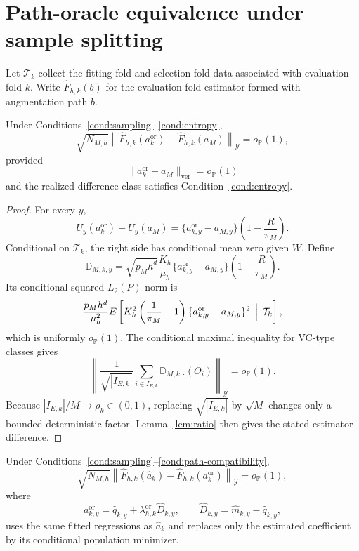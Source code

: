\section{Path-oracle equivalence under sample splitting}
\label{sec:supp-oracle}

Let \(\mathcal T_k\) collect the fitting-fold and selection-fold data associated with evaluation fold \(k\).
Write \(\widehat F_{h,k}(b)\) for the evaluation-fold estimator formed with augmentation path \(b\).

\begin{lemma}
\label{lem:nuisance-perturb}
Under Conditions~\ref{cond:sampling}--\ref{cond:entropy},
\[
\sqrt{N_{M,h}}
\left\|
\widehat F_{h,k}(a_k^{\mathrm{or}})
-
\widehat F_{h,k}(a_M)
\right\|_{\mathcal Y}
=o_{\mathbb P}(1),
\]
provided
\[
\|a_k^{\mathrm{or}}-a_M\|_{\mathrm{ver}}
=o_{\mathbb P}(1)
\]
and the realized difference class satisfies Condition~\ref{cond:entropy}.
\end{lemma}

\begin{proof}
For every \(y\),
\begin{equation}
U_y(a_k^{\mathrm{or}})-U_y(a_M)
=
\{a_{k,y}^{\mathrm{or}}-a_{M,y}\}
\left(1-\frac{R}{\pi_M}\right).
\label{eq:nuisance-exact}
\end{equation}
Conditional on \(\mathcal T_k\), the right side has conditional mean zero given \(W\). Define
\[
\mathbb D_{M,k,y}
=
\sqrt{p_Mh^d}
\frac{K_h}{\mu_h}
\{a_{k,y}^{\mathrm{or}}-a_{M,y}\}
\left(1-\frac{R}{\pi_M}\right).
\]
Its conditional squared \(L_2(P)\) norm is
\[
\frac{p_Mh^d}{\mu_h^2}
E\left[
K_h^2
\left(\frac1{\pi_M}-1\right)
\{a_{k,y}^{\mathrm{or}}-a_{M,y}\}^2
\,\Bigm|\,\mathcal T_k
\right],
\]
which is uniformly \(o_{\mathbb P}(1)\). The conditional maximal inequality for VC-type classes gives
\[
\left\|
\frac1{\sqrt{|I_{E,k}|}}
\sum_{i\in I_{E,k}}
\mathbb D_{M,k,\cdot}(O_i)
\right\|_{\mathcal Y}
=o_{\mathbb P}(1).
\]
Because \(|I_{E,k}|/M\to\rho_k\in(0,1)\), replacing \(\sqrt{|I_{E,k}|}\) by \(\sqrt M\) changes only a bounded deterministic factor. Lemma~\ref{lem:ratio} then gives the stated estimator difference.
\end{proof}

\begin{lemma}
\label{lem:coefficient-perturb}
Under Conditions~\ref{cond:sampling}--\ref{cond:path-compatibility},
\[
\sqrt{N_{M,h}}
\left\|
\widehat F_{h,k}(\widehat a_k)
-
\widehat F_{h,k}(a_k^{\mathrm{or}})
\right\|_{\mathcal Y}
=o_{\mathbb P}(1),
\]
where
\[
a_{k,y}^{\mathrm{or}}
=
\widehat q_{k,y}
+
\lambda_{h,k}^{\mathrm{or}}
\widehat D_{k,y},
\qquad
\widehat D_{k,y}=\widehat m_{k,y}-\widehat q_{k,y},
\]
uses the same fitted regressions as \(\widehat a_k\) and replaces only the estimated coefficient by its conditional population minimizer.
\end{lemma}

